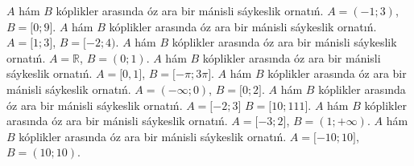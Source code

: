 \(A\) hám \(B\) kóplikler arasında óz ara bir mánisli sáykeslik ornatıń. \(A = ( - 1;3)\), \(B = \lbrack 0;9\rbrack\).
\(A\) hám \(B\) kóplikler arasında óz ara bir mánisli sáykeslik ornatıń. \(A = \lbrack 1;3\rbrack\), \(B = \lbrack - 2;4)\).
\(A\) hám \(B\) kóplikler arasında óz ara bir mánisli sáykeslik ornatıń. \(A\mathbb{= R}\), \(B = (0;1)\).
\(A\) hám \(B\) kóplikler arasında óz ara bir mánisli sáykeslik ornatıń. \(A = \lbrack 0,1\rbrack\), \(B = \lbrack - \pi;3\pi\rbrack\).
\(A\) hám \(B\) kóplikler arasında óz ara bir mánisli sáykeslik ornatıń. \(A = ( - \infty;0)\), \(B = \lbrack 0;2\rbrack\).
\(A\) hám \(B\) kóplikler arasında óz ara bir mánisli sáykeslik ornatıń. \(A = \lbrack - 2;3\rbrack\) \(B = \lbrack 10;111\rbrack\).
\(A\) hám \(B\) kóplikler arasında óz ara bir mánisli sáykeslik ornatıń. \(A = \lbrack - 3;2\rbrack\), \(B = (1; + \infty)\).
\(A\) hám \(B\) kóplikler arasında óz ara bir mánisli sáykeslik ornatıń. \(A = \lbrack - 10;10\rbrack\),\(B = (10;10)\).